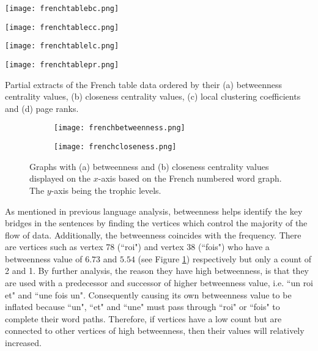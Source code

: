 \begin{table}[!htb]
\centering
\begin{subtable}{.27\textwidth}
	\texttt{[image: frenchtablebc.png]}
	\caption{}
	\label{table:frenchtablebc}
\end{subtable}
\hfill
\begin{subtable}{.2\textwidth}
	\centering
	\texttt{[image: frenchtablecc.png]}
	\caption{}
	\label{table:frenchtablecc}
\end{subtable}
\hfill
\begin{subtable}{.2\textwidth}
	\centering
	\texttt{[image: frenchtablelc.png]}
	\caption{}
	\label{table:frenchtablelc}
\end{subtable}
\hfill
\begin{subtable}{.2\textwidth}
	\centering
	\texttt{[image: frenchtablepr.png]}
	\caption{}
	\label{table:frenchtablepr}
\end{subtable}
\caption{Partial extracts of the French table data ordered by their (a) betweenness centrality values, (b) closeness centrality values, (c) local clustering coefficients and (d) page ranks.}
\label{table:frenchdata}
\end{table}

\begin{figure}[!htb]
\centering
\begin{subfigure}{.45\textwidth}
	\hspace{-1cm} 
	\texttt{[image: frenchbetweenness.png]}
	\caption{}
	\label{fig:frbc}
\end{subfigure}
\hfill
\begin{subfigure}{.45\textwidth}
	\hspace{-1cm} 
	\texttt{[image: frenchcloseness.png]}
	\caption{ }
	\label{fig:frcc}
\end{subfigure}
\caption{Graphs with (a) betweenness and (b) closeness centrality values displayed on the $x$-axis based on the French numbered word graph. The $y$-axis being the trophic levels.}
\label{fig:frcentrality}
\end{figure}

As mentioned in previous language analysis, betweenness helps identify the key bridges in the sentences by finding the vertices which control the majority of the flow of data. Additionally, the betweenness coincides with the frequency. There are vertices such as vertex 78 (``roi") and vertex 38 (``fois") who have a betweenness value of $6.73$ and $5.54$ (see Figure \ref{fig:frbc}) respectively but only a count of 2 and 1. By further analysis, the reason they have high betweenness, is that they are used with a predecessor and successor of higher betweenness value, i.e. ``un roi et" and ``une fois un". Consequently causing its own betweenness value to be inflated because ``un", ``et" and ``une" must pass through ``roi" or ``fois" to complete their word paths. Therefore, if vertices have a low count but are connected to other vertices of high betweenness, then their values will relatively increased.

